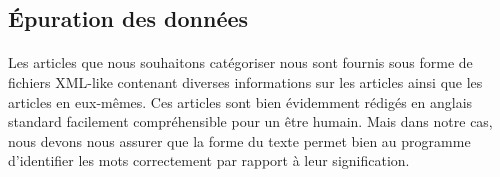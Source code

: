 \subsection{Épuration des données}

\paragraph{}
Les articles que nous souhaitons catégoriser nous sont fournis sous forme de fichiers XML-like contenant diverses informations sur les articles ainsi que les articles en eux-mêmes. Ces articles sont bien évidemment rédigés en anglais standard facilement compréhensible pour un être humain. Mais dans notre cas, nous devons nous assurer que la forme du texte permet bien au programme d'identifier les mots correctement par rapport à leur signification.

